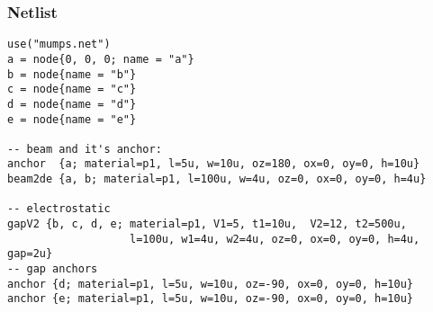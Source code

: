 \subsubsection*{Netlist}

\begin{verbatim}
use("mumps.net")
a = node{0, 0, 0; name = "a"}
b = node{name = "b"}
c = node{name = "c"}
d = node{name = "d"}
e = node{name = "e"}

-- beam and it's anchor: 
anchor  {a; material=p1, l=5u, w=10u, oz=180, ox=0, oy=0, h=10u}
beam2de {a, b; material=p1, l=100u, w=4u, oz=0, ox=0, oy=0, h=4u}

-- electrostatic 
gapV2 {b, c, d, e; material=p1, V1=5, t1=10u,  V2=12, t2=500u, 
                   l=100u, w1=4u, w2=4u, oz=0, ox=0, oy=0, h=4u, gap=2u}
-- gap anchors 
anchor {d; material=p1, l=5u, w=10u, oz=-90, ox=0, oy=0, h=10u}
anchor {e; material=p1, l=5u, w=10u, oz=-90, ox=0, oy=0, h=10u}
\end{verbatim}
